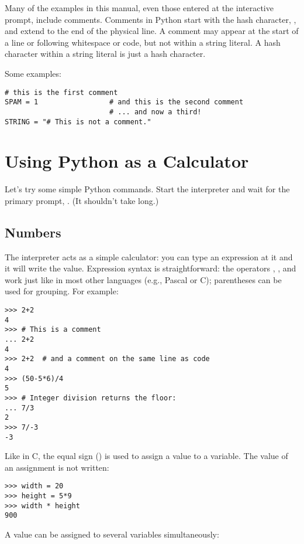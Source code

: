 \documentclass{manual}
\begin{document}
Many of the examples in this manual, even those entered at the
interactive prompt, include comments.  Comments in Python start with
the hash character, \character{\#}, and extend to the end of the
physical line.  A comment may appear at the start of a line or
following whitespace or code, but not within a string literal.  A hash 
character within a string literal is just a hash character.

Some examples:

\begin{verbatim}
# this is the first comment
SPAM = 1                 # and this is the second comment
                         # ... and now a third!
STRING = "# This is not a comment."
\end{verbatim}


\section{Using Python as a Calculator \label{calculator}}

Let's try some simple Python commands.  Start the interpreter and wait
for the primary prompt, \samp{>>> }.  (It shouldn't take long.)

\subsection{Numbers \label{numbers}}

The interpreter acts as a simple calculator: you can type an
expression at it and it will write the value.  Expression syntax is
straightforward: the operators \code{+}, \code{-}, \code{*} and
\code{/} work just like in most other languages (e.g., Pascal or C);
parentheses can be used for grouping.  For example:

\begin{verbatim}
>>> 2+2
4
>>> # This is a comment
... 2+2
4
>>> 2+2  # and a comment on the same line as code
4
>>> (50-5*6)/4
5
>>> # Integer division returns the floor:
... 7/3
2
>>> 7/-3
-3
\end{verbatim}

Like in C, the equal sign (\character{=}) is used to assign a value to a
variable.  The value of an assignment is not written:

\begin{verbatim}
>>> width = 20
>>> height = 5*9
>>> width * height
900
\end{verbatim}

A value can be assigned to several variables simultaneously:
\end{document}

